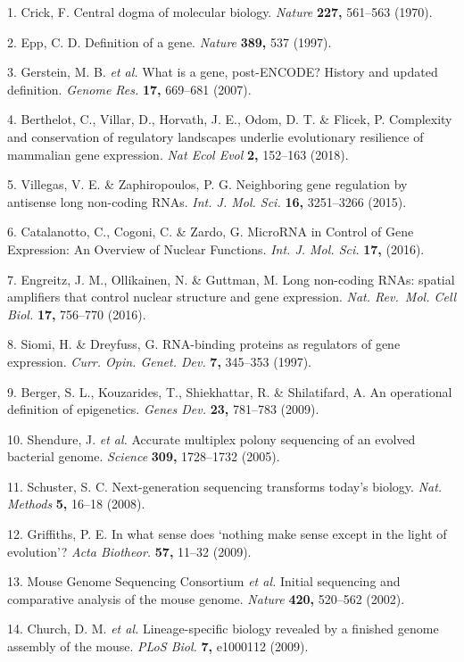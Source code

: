 \documentclass[11pt,twoside]{MPIthesis}
\theoremstyle{definition}
\theoremstyle{definition}
\theoremstyle{definition}
\theoremstyle{remark}
\begin{document}
1. Crick, F. Central dogma of molecular biology. \emph{Nature}
\textbf{227,} 561--563 (1970).

2. Epp, C. D. Definition of a gene. \emph{Nature} \textbf{389,} 537
(1997).

3. Gerstein, M. B. \emph{et al.} What is a gene, post-ENCODE? History
and updated definition. \emph{Genome Res.} \textbf{17,} 669--681 (2007).

4. Berthelot, C., Villar, D., Horvath, J. E., Odom, D. T. \& Flicek, P.
Complexity and conservation of regulatory landscapes underlie
evolutionary resilience of mammalian gene expression. \emph{Nat Ecol
Evol} \textbf{2,} 152--163 (2018).

5. Villegas, V. E. \& Zaphiropoulos, P. G. Neighboring gene regulation
by antisense long non-coding RNAs. \emph{Int. J. Mol. Sci.} \textbf{16,}
3251--3266 (2015).

6. Catalanotto, C., Cogoni, C. \& Zardo, G. MicroRNA in Control of Gene
Expression: An Overview of Nuclear Functions. \emph{Int. J. Mol. Sci.}
\textbf{17,} (2016).

7. Engreitz, J. M., Ollikainen, N. \& Guttman, M. Long non-coding RNAs:
spatial amplifiers that control nuclear structure and gene expression.
\emph{Nat. Rev.~Mol. Cell Biol.} \textbf{17,} 756--770 (2016).

8. Siomi, H. \& Dreyfuss, G. RNA-binding proteins as regulators of gene
expression. \emph{Curr. Opin. Genet. Dev.} \textbf{7,} 345--353 (1997).

9. Berger, S. L., Kouzarides, T., Shiekhattar, R. \& Shilatifard, A. An
operational definition of epigenetics. \emph{Genes Dev.} \textbf{23,}
781--783 (2009).

10. Shendure, J. \emph{et al.} Accurate multiplex polony sequencing of
an evolved bacterial genome. \emph{Science} \textbf{309,} 1728--1732
(2005).

11. Schuster, S. C. Next-generation sequencing transforms today's
biology. \emph{Nat. Methods} \textbf{5,} 16--18 (2008).

12. Griffiths, P. E. In what sense does `nothing make sense except in
the light of evolution'? \emph{Acta Biotheor.} \textbf{57,} 11--32
(2009).

13. Mouse Genome Sequencing Consortium \emph{et al.} Initial sequencing
and comparative analysis of the mouse genome. \emph{Nature}
\textbf{420,} 520--562 (2002).

14. Church, D. M. \emph{et al.} Lineage-specific biology revealed by a
finished genome assembly of the mouse. \emph{PLoS Biol.} \textbf{7,}
e1000112 (2009).
\end{document}
